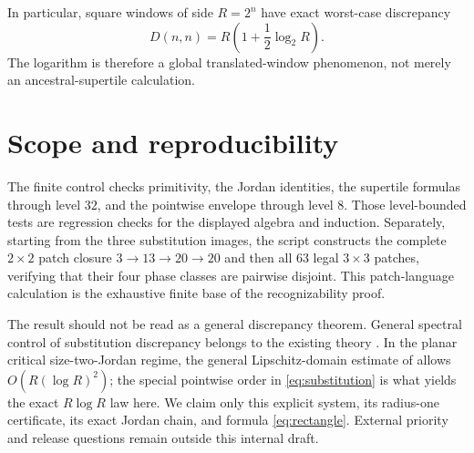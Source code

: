 \documentclass[11pt,a4paper]{amsart}
\theoremstyle{definition}
\theoremstyle{remark}
\begin{document}
In particular, square windows of side $R=2^n$ have exact worst-case
discrepancy
\[
 D(n,n)=R\left(1+\frac12\log_2R\right).
\]
The logarithm is therefore a global translated-window phenomenon, not merely
an ancestral-supertile calculation.

\section{Scope and reproducibility}

The finite control checks primitivity, the Jordan identities, the supertile
formulas through level $32$, and the pointwise envelope through level $8$.
Those level-bounded tests are regression checks for the displayed algebra and
induction.  Separately, starting from the three substitution images, the
script constructs the complete $2\times2$ patch closure
$3\to13\to20\to20$ and then all $63$ legal $3\times3$ patches, verifying that
their four phase classes are pairwise disjoint.  This patch-language
calculation is the exhaustive finite base of the recognizability proof.

The result should not be read as a general discrepancy theorem.  General
spectral control of substitution discrepancy belongs to the existing theory
\cite{Adamczewski2004,BufetovSolomyak2013}.  In the planar critical
size-two-Jordan regime, the general Lipschitz-domain estimate of
\citet[Corollary~4.5]{BufetovSolomyak2013} allows
$O(R(\log R)^2)$; the special pointwise order in
\eqref{eq:substitution} is what yields the exact $R\log R$ law here.  We claim
only this explicit system, its radius-one certificate, its exact Jordan
chain, and formula \eqref{eq:rectangle}.  External priority and release
questions remain outside this internal draft.



\end{document}
